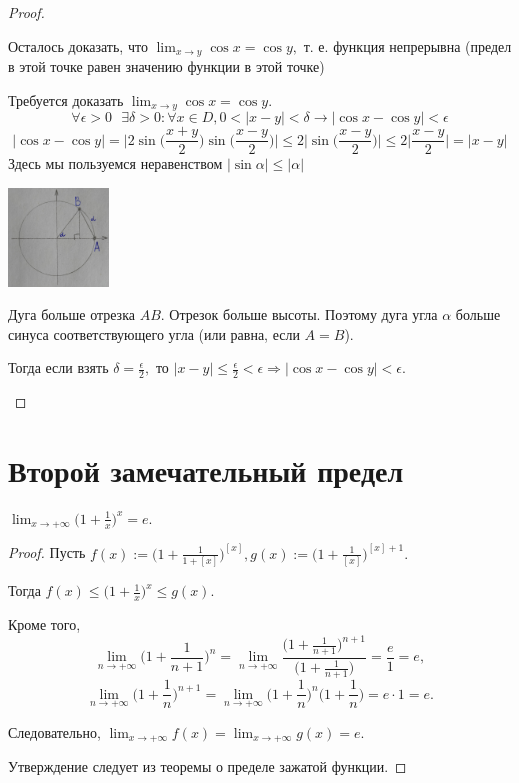 \begin{proof}
\begin{enumerate}
			Осталось доказать, что $\lim_{x \to y} \cos{x} = \cos{y},$ т. е. функция непрерывна (предел в этой точке равен значению функции в этой точке)
			
			Требуется доказать $\displaystyle \lim_{x \to y} \cos{x} = \cos{y}.$
			\[ \forall \epsilon > 0 \text{ } \exists \delta > 0: \forall x \in D, 0 < |x - y| < \delta \rightarrow |\cos{x} - \cos{y}| < \epsilon \]
			\[ |\cos{x} - \cos{y}| = \bigg|2\sin{\bigg(\frac{x + y}{2}\bigg)}\sin{\bigg(\frac{x - y}{2}\bigg)}\bigg| \leqslant 2\bigg|\sin{\bigg(\frac{x - y}{2}\bigg)}\bigg| \leqslant 2\bigg|\frac{x - y}{2}\bigg| = |x - y| \]
			Здесь мы пользуемся неравенством $|\sin{\alpha}| \leqslant |\alpha|$
			\begin{center}
				\includegraphics[width=0.2\textwidth]{img/lecture10/sin_inequality}
			\end{center}
			Дуга больше отрезка $AB$. Отрезок больше высоты. Поэтому дуга угла $\alpha$ больше синуса соответствующего угла (или равна, если $A = B$).
			
			Тогда если взять $\delta = \frac{\epsilon}{2},$ то $|x - y| \leqslant \frac{\epsilon}{2} < \epsilon \Rightarrow |\cos{x} - \cos{y}| < \epsilon.$ 
		\end{enumerate}
	\end{proof}
	
	\section{Второй замечательный предел}
	
	\begin{sentence}
		$\displaystyle \lim_{x \to +\infty} \bigg(1 + \frac{1}{x}\bigg)^x = e.$
	\end{sentence}
	
	\begin{proof}
		Пусть $f(x) := \big(1 + \frac{1}{1 + [x]}\big)^{[x]}, g(x) := \big(1 + \frac{1}{[x]}\big)^{[x] + 1}.$
		
		Тогда $f(x) \leqslant \big(1 + \frac{1}{x}\big)^x \leqslant g(x).$
		
		Кроме того, 
		\[ \lim_{n \to +\infty} \bigg(1 + \frac{1}{n + 1}\bigg)^n = \lim_{n \to +\infty} \frac{\big(1 + \frac{1}{n + 1}\big)^{n + 1}}{\big(1 + \frac{1}{n + 1}\big)} = \frac{e}{1} = e, \]
		\[ \lim_{n \to +\infty} \bigg(1 + \frac{1}{n}\bigg)^{n + 1} = \lim_{n \to +\infty} \bigg(1 + \frac{1}{n}\bigg)^n \bigg(1 + \frac{1}{n}\bigg) = e \cdot 1 = e. \]
		
		Следовательно, $\displaystyle \lim_{x \to +\infty} f(x) = \lim_{x \to +\infty} g(x) = e.$
		
		Утверждение следует из теоремы о пределе зажатой функции.
	\end{proof}
	
